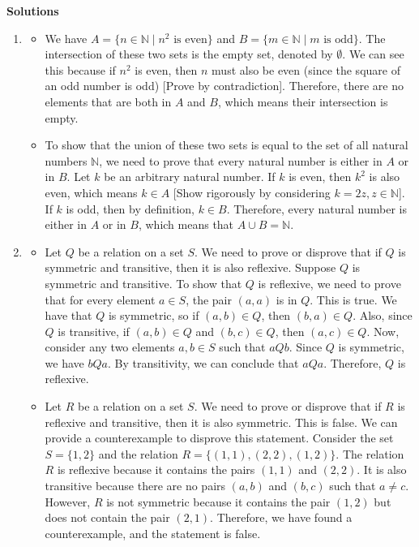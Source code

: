 \documentclass{article}
\begin{document}
\newpage
\textbf{Solutions}
\begin{enumerate}
    \item 
    \begin{itemize}
    \item We have $A = \{n \in \mathbb{N} \mid n^2 \text{ is even}\}$ and $B = \{m \in \mathbb{N} \mid m \text{ is odd}\}$. The intersection of these two sets is the empty set, denoted by $\emptyset$. We can see this because if $n^2$ is even, then $n$ must also be even (since the square of an odd number is odd) [Prove by contradiction]. Therefore, there are no elements that are both in $A$ and $B$, which means their intersection is empty.
    \item To show that the union of these two sets is equal to the set of all natural numbers $\mathbb{N}$, we need to prove that every natural number is either in $A$ or in $B$.
    Let $k$ be an arbitrary natural number. If $k$ is even, then $k^2$ is also even, which means $k \in A$ [Show rigorously by considering $k = 2z, z \in \mathbb{N}$]. If $k$ is odd, then by definition, $k \in B$. Therefore, every natural number is either in $A$ or in $B$, which means that $A \cup B = \mathbb{N}$.
    \end{itemize}
    \item \begin{itemize}
        \item Let $Q$ be a relation on a set $S$. We need to prove or disprove that if $Q$ is symmetric and transitive, then it is also reflexive. 
        Suppose $Q$ is symmetric and transitive. To show that $Q$ is reflexive, we need to prove that for every element $a \in S$, the pair $(a, a)$ is in $Q$. 
        This is true. We have that $Q$ is symmetric, so if $(a, b) \in Q$, then $(b, a) \in Q$. Also, since $Q$ is transitive, if $(a, b) \in Q$ and $(b, c) \in Q$, then $(a, c) \in Q$.
        Now, consider any two elements $a, b \in S$ such that $aQb$. Since $Q$ is symmetric, we have $bQa$. By transitivity, we can conclude that $aQa$. Therefore, $Q$ is reflexive.
        \item Let $R$ be a relation on a set $S$. We need to prove or disprove that if $R$ is reflexive and transitive, then it is also symmetric.
        This is false. We can provide a counterexample to disprove this statement. Consider the set $S = \{1, 2\}$ and the relation $R = \{(1, 1), (2, 2), (1, 2)\}$.
        The relation $R$ is reflexive because it contains the pairs $(1, 1)$ and $(2, 2)$. It is also transitive because there are no pairs $(a, b)$ and $(b, c)$ such that $a \neq c$. However, $R$ is not symmetric because it contains the pair $(1, 2)$ but does not contain the pair $(2, 1)$. Therefore, we have found a counterexample, and the statement is false.

\end{itemize}
\end{enumerate}
\end{document}
